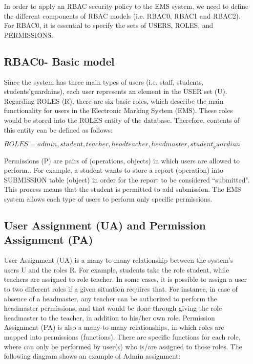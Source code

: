 In order to apply an RBAC security policy to the EMS system, we need to define the different components of RBAC models (i.e. RBAC0, RBAC1 and RBAC2).  For RBAC0, it is essential to specify the sets of USERS, ROLES, and PERMISSIONS.

\subsection{RBAC0- Basic model}
Since the system has three main types of users (i.e. staff, students, students’guardains), each user represents an element in the USER set (U).  Regarding ROLES (R), there are six basic roles, which describe the main functionality for users in the Electronic Marking System (EMS).  These roles would be stored into the ROLES entity of the database.  Therefore, contents of this entity can be defined as follows:

$ROLES = {admin, student, teacher, headteacher, headmaster, student_guardian}$

Permissions (P) are pairs of (operations, objects) in which users are allowed to perform..  For example, a student wants to store a report (operation) into SUBMISSION table (object) in order for the report to be considered “submitted”.  This process means that the student is permitted to add submission.  The EMS system allows each type of users to perform only specific permissions. 



\subsection{User Assignment (UA) and Permission Assignment (PA)}
User Assignment (UA) is a many-to-many relationship between the system’s users U and the roles R.  For example, students take the role student, while teachers are assigned to role teacher.  In some cases, it is possible to assign a user to two different roles if a given situation requires that.  For instance, in case of absence of a headmaster, any teacher can be authorized to perform the headmaster permissions, and that would be done through giving the role headmaster to the teacher, in addition to his/her own role.
      Permission Assignment (PA) is also a many-to-many relationships, in which roles are mapped into permissions (functions).  There are specific functions for each role, where can only be performed by user(s) who is/are assigned to those roles.  The following diagram shows an example of Admin assignment:


